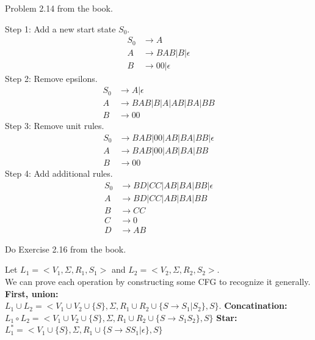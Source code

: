 \newpage \begin{problem}{4}
  Problem 2.14 from the book.
  \begin{solution}
    Step 1: Add a new start state $S_0$.
    \begin{align*}
      S_0 &\rightarrow A \\
      A &\rightarrow BAB|B|\epsilon \\
      B &\rightarrow 00|\epsilon
    \end{align*}
    Step 2: Remove epsilons.
    \begin{align*}
      S_0 &\rightarrow A | \epsilon \\
      A &\rightarrow BAB|B|A|AB|BA|BB \\
      B &\rightarrow 00
    \end{align*}
    Step 3: Remove unit rules.
    \begin{align*}
      S_0 &\rightarrow BAB|00|AB|BA|BB| \epsilon \\
      A &\rightarrow BAB|00|AB|BA|BB \\
      B &\rightarrow 00
    \end{align*}
    Step 4: Add additional rules.
    \begin{align*}
      S_0 &\rightarrow BD|CC|AB|BA|BB| \epsilon \\
      A &\rightarrow BD|CC|AB|BA|BB \\
      B &\rightarrow CC \\
      C &\rightarrow 0 \\
      D &\rightarrow AB
    \end{align*}
  \end{solution}
\end{problem}

\begin{problem}{5}
  Do Exercise 2.16 from the book.
  \begin{solution}
    Let $L_1 = <V_1, \Sigma, R_1, S_1>$ and $L_2 = <V_2, \Sigma, R_2, S_2>$. \\ We can prove each operation by
    constructing some CFG to recognize it generally.
    \br
    \textbf{First, union:} \\ $L_1 \cup L_2 = < V_1 \cup V_2 \cup \{S\}, \Sigma,
    R_1 \cup R_2 \cup \{ S \rightarrow S_1|S_2 \}, S \}$.
    \br
    \textbf{Concatination:} \\
    $L_1 \circ L_2 = < V_1 \cup V_2 \cup \{S\}, \Sigma, R_1 \cup R_2 \cup \{ S \rightarrow S_1S_2 \}, S \}$
    \br
    \textbf{Star:} \\
    $L_1^* = < V_1 \cup \{S\}, \Sigma, R_1 \cup \{ S \rightarrow SS_1|\epsilon \}, S \}$
  \end{solution}
\end{problem}

